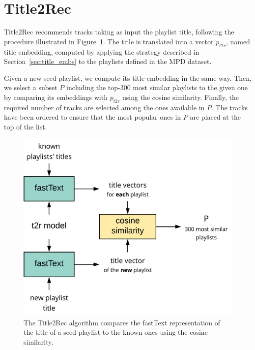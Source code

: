 \section{Title2Rec}
\label{sec:t2r}
Title2Rec recommends tracks taking as input the playlist title, following the procedure illustrated in Figure~\ref{fig:t2r_rec}. The title is translated into a vector $p_{t2r}$, named title embedding, computed by applying the strategy described in Section~\ref{sec:title_embs} to the playlists defined in the MPD dataset.

Given a new seed playlist, we compute its title embedding in the same way. Then, we select a subset $P$ including the top-300 most similar playlists to the given one by comparing its embeddings with $p_{t2r}$ using the cosine similarity. Finally, the required number of tracks are selected among the ones available in $P$. The tracks have been ordered to ensure that the most popular ones in $P$ are placed at the top of the list.

\begin{figure}
    \centering
    \includegraphics[width=\textwidth, width=0.4\textwidth]{figures/t2r_rec.pdf}
    \caption{The Title2Rec algorithm compares the fastText representation of the title of a seed playlist to the known ones using the cosine similarity.}
    \label{fig:t2r_rec}
\end{figure}
